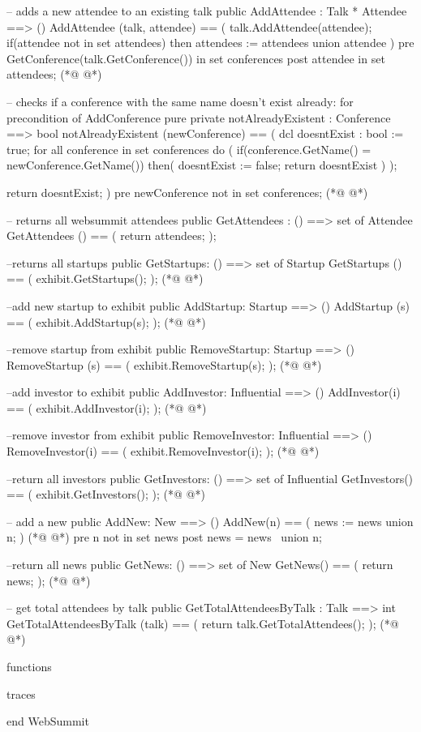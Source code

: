 \begin{vdmpp}[breaklines=true]
  -- adds a new attendee to an existing talk
  public AddAttendee : Talk * Attendee ==> ()
    AddAttendee (talk, attendee) == (
     talk.AddAttendee(attendee);
     if(attendee not in set attendees)
      then attendees := attendees union {attendee}
    )
    pre GetConference(talk.GetConference()) in set conferences
    post attendee in set attendees; 
(*@
\label{notAlreadyExistent:214}
@*)
  
  -- checks if a conference with the same name doesn't exist already: for precondition of AddConference
    pure private notAlreadyExistent : Conference ==> bool
    notAlreadyExistent (newConference) == (
    dcl doesntExist : bool := true;
    for all conference in set conferences do (
     if(conference.GetName() = newConference.GetName())
     then(
        doesntExist := false;
        return doesntExist
       )
     );
     
     return doesntExist;
    )
    pre newConference not in set conferences;
(*@
\label{GetAttendees:230}
@*)
    
 -- returns all websummit attendees
  public GetAttendees : () ==> set of Attendee
    GetAttendees () == (
     return attendees;
    );  
 
  --returns all startups
  public GetStartups: () ==> set of Startup
    GetStartups () == (
     exhibit.GetStartups();
    );
(*@
\label{GetStartups:242}
@*)
 
  --add new startup to exhibit
  public AddStartup: Startup ==> ()
    AddStartup (s) == (
     exhibit.AddStartup(s);
    );
(*@
\label{AddStartup:248}
@*)
 
  --remove startup from exhibit    
  public RemoveStartup: Startup ==> ()
    RemoveStartup (s) == (
     exhibit.RemoveStartup(s);
    );
(*@
\label{RemoveStartup:254}
@*)
    
  --add investor to exhibit
  public AddInvestor: Influential ==> ()
   AddInvestor(i) == (
    exhibit.AddInvestor(i);
   );
(*@
\label{AddInvestor:260}
@*)
  
  --remove investor from exhibit
  public RemoveInvestor: Influential ==> ()
   RemoveInvestor(i) == (
    exhibit.RemoveInvestor(i);
   );
(*@
\label{RemoveInvestor:266}
@*)
  
  --return all investors
  public GetInvestors: () ==> set of Influential
   GetInvestors() == (
    exhibit.GetInvestors();
   ); 
(*@
\label{GetInvestors:272}
@*)
  
  -- add a new
  public AddNew: New ==> ()
   AddNew(n) == (
    news := news union {n};
    )
(*@
\label{AddNew:278}
@*)
    pre n not in set news
   post news = news~ union {n};
  
  --return all news
  public GetNews: () ==> set of New
   GetNews() == (
    return news;
   );
(*@
\label{GetNews:286}
@*)
   
  -- get total attendees by talk 
  public GetTotalAttendeesByTalk : Talk ==> int
   GetTotalAttendeesByTalk (talk) == (
    return talk.GetTotalAttendees();
   );  
(*@
\label{GetTotalAttendeesByTalk:292}
@*)
  
functions

traces

end WebSummit
\end{vdmpp}
